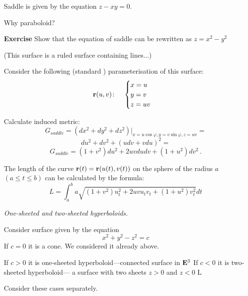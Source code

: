 \documentclass[12pt]{article}
\theoremstyle{theorem}
\numberwithin{equation}{section}
\begin{document}
  Saddle is given by the equation $z-xy=0$.

Why paraboloid?

{\bf Exercise} Show that the equation of saddle can be rewritten as $z=x^2-y^2$

\m

  (This surface is a ruled surface containing lines...)

  Consider the following
(standard ) parameterisation
 of this surface:
\begin{equation}\label{surface3}
  {\bf r}(u,v)\colon\quad
  \begin{cases}
  x=u\\
  y=v\\
  z=uv\\
  \end{cases}
\end{equation}

\medskip

Calculate induced metric:
                       $$
 G_{saddle}=\left(dx^2+dy^2+dz^2\right)\big\vert_{x=u\cos\varphi,y=v\sin\varphi,z=uv}=
                      $$
                      $$
                      du^2+dv^2+(udv+vdu)^2=
                      $$
        \begin{equation}\label{firtsquadraticformforsaddle(diff)}
            G_{saddle} =(1+v^2)du^2+2uvdudv+(1+u^2)dv^2\,.
            \end{equation}

 The length of the curve ${\bf r}(t)={\bf r} (u(t), v(t))$ on the
  sphere of the radius $a$
    $(a\leq t\leq b)$
  can be calculated by the formula:
               \begin{equation}
             L=\int_a^b
             a\sqrt{(1+v^2)u^2_t+2uvu_tv_t+(1+u^2)v^2_t}dt
               \end{equation}

\medskip

    \centerline {\it One-sheeted and two-sheeted hyperboloids.}


    Consider surface given by the equation
                $$
              x^2+y^2-z^2=c
                $$
    If $c=0$ it is a cone. We considered it already above.

     If $c>0$ it is  one-sheeted hyperboloid---connected surface in ${\bf E}^3$
     If $c<0$ it is two-sheeted hyperboloid--- a surface with two sheets $z>0 $ and $z<0$
L

    \m
     Consider these cases separately.

     \m
\end{document}
